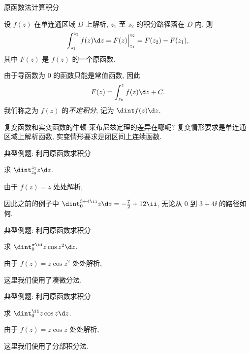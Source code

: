 \begin{frame}{原函数法计算积分}
	\onslide<+->
	\begin{theorem*}
		设 $f(z)$ 在单连通区域 $D$ 上解析, $z_1$ 至 $z_2$ 的积分路径落在 $D$ 内, 则
		\[
			\int_{z_1}^{z_2}f(z)\d z=F(z)\Big|_{z_1}^{z_2}=F(z_2)-F(z_1),
		\]
		其中 $F(z)$ 是 $f(z)$ 的一个原函数.
	\end{theorem*}
	\onslide<+->
	由于导函数为 $0$ 的函数只能是常值函数, 因此
	\[
		F(z)=\int_{z_0}^zf(z)\d z+C.
	\]
	\onslide<+->
	我们称之为 $f(z)$ 的\emph{不定积分}, 记为 \emph{$\dint f(z)\d z$}.

	\onslide<+->
	复变函数和实变函数的牛顿-莱布尼兹定理的差异在哪呢?
	\onslide<+->
	复变情形要求是\alert{单连通区域上解析函数}, 实变情形要求是\alert{闭区间上连续函数}.
\end{frame}


\begin{frame}{典型例题: 利用原函数求积分}
	\onslide<+->
	\begin{example}[nearnext]
		求 $\dint_{z_0}^{z_1}z\d z$.
	\end{example}
	\onslide<+->
	\begin{solution}[nearprev]
		由于 $f(z)=z$ 处处解析,
		\bigdel
	\end{solution}
	\onslide<+->
	因此之前的例子中 $\dint_0^{3+4\ii}z\d z=-\frac72+12\ii$, 无论从 $0$ 到 $3+4\ii$ 的路径如何.
\end{frame}


\begin{frame}{典型例题: 利用原函数求积分}
	\onslide<+->
	\begin{example}[nearnext]
		求 $\dint_0^{\pi\ii}z\cos z^2\d z$.
	\end{example}
	\onslide<+->
	\begin{solution}[nearprev]
		由于 $f(z)=z\cos z^2$ 处处解析,
		\bigdel
	\end{solution}
	\onslide<+->
	这里我们使用了\alert{凑微分法}.
\end{frame}


\begin{frame}{典型例题: 利用原函数求积分}
	\onslide<+->
	\begin{example}[nearnext]
		求 $\dint_0^\ii z\cos z\d z$.
	\end{example}
	\onslide<+->
	\begin{solution}[nearprev]
		由于 $f(z)=z\cos z$ 处处解析,
		\bigdel
	\end{solution}
	\onslide<+->
	这里我们使用了\alert{分部积分法}.
\end{frame}


